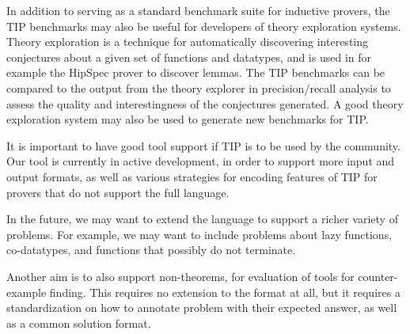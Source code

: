 \documentclass{llncs}
\begin{document}
In addition to serving as a standard benchmark suite for 
inductive provers, the TIP benchmarks may also be useful for 
developers of theory exploration systems. Theory exploration is 
a technique for automatically discovering interesting 
conjectures about a given set of functions and datatypes, and is 
used in for example the HipSpec prover to discover lemmas. The 
TIP benchmarks can be compared to the output from the theory 
explorer in precision/recall analysis to assess the quality and 
interestingness of the conjectures generated. A good theory 
exploration system may also be used to generate new benchmarks 
for TIP.

It is important to have good tool support if TIP is to be used 
by the community. Our tool is currently in active development, 
in order to support more input and output formats, as well as 
various strategies for encoding features of TIP for provers that 
do not support the full language.


In the future, we may want to extend the language to support a 
richer variety of problems. For example, we may want to include 
problems about lazy functions, co-datatypes, and functions that 
possibly do not terminate.


Another aim is to also support non-theorems, for evaluation of 
tools for counter-example finding. This requires no extension to 
the format at all, but it requires a standardization on how to 
annotate problem with their expected answer, as well as a common 
solution format.



\end{document}
